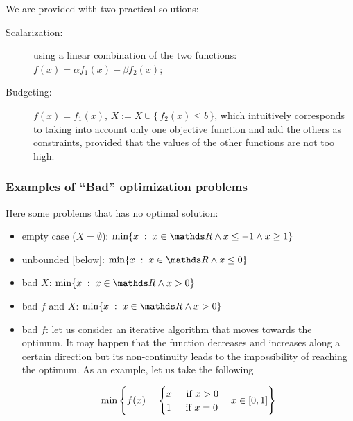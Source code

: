 \documentclass[computationalMathematics.tex]{subfiles}
\begin{document}
\newpage
We are provided with two practical solutions:

\begin{description}
  \item[{\sc Scalarization:}] using a linear combination of the two functions: $f(x) = \alpha f_1(x) + \beta f_2(x)$;
  \item[{\sc Budgeting:}] $f(x) = f_1(x)$, $X := X \cup \{ \, f_2(x) \leq b \, \}$, which intuitively corresponds to taking into account only one objective function and add the others as constraints, provided that the values of the other functions are not too high.
\end{description}

\subsubsection{Examples of “Bad” optimization problems}
Here some problems that has no optimal solution:
\begin{itemize}
    \item empty case ($X = \emptyset$): $\min\{ x \; : \; x \in \R \land x \leq -1 \land x \geq 1\}$
    \item unbounded [below]:  $\min\{ x \; : \; x \in \R \land x \leq 0\}$
    \item bad $X$:  $\min\{ x \; : \; x \in \R \land x > 0\}$
    \item bad $f$ and  $X$:  $\min\{ x \; : \; x \in \R \land x > 0\}$
    \item bad $f$: let us consider an iterative algorithm that moves towards the optimum.
It may happen that the function decreases and increases along a certain direction but its non-continuity leads to the impossibility of reaching the optimum.
As an example, let us take the following

\[
  \min \left\{f(x) =
    \begin{cases}
      x \hspace{0.4cm} \text{ if } x > 0 \\
      1 \hspace{0.4cm} \text{ if } x = 0
    \end{cases}
    x \in [0, 1]\right\}
\]
\end{itemize}
\newpage
\end{document}
